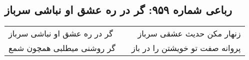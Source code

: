 \begin{center}
\section*{رباعی شماره ۹۵۹: گر در ره عشق او نباشی سرباز}
\label{sec:0959}
\begin{longtable}{l p{0.5cm} r}
گر در ره عشق او نباشی سرباز
&&
زنهار مکن حدیث عشقی سرباز
\\
گر روشنی میطلبی همچون شمع
&&
پروانه صفت تو خویشتن را در باز
\\
\end{longtable}
\end{center}
